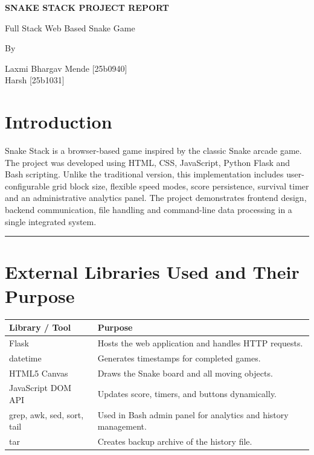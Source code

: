 \documentclass[12pt,a4paper]{article}
\newcommand{\sectionsep}{
    \vspace{1.5em}
    \noindent\rule{\textwidth}{0.8pt}
    \vspace{1.5em}
}
\begin{document}
\begin{titlepage}
    \centering
    \vspace*{2cm}
    {\LARGE\bfseries SNAKE STACK PROJECT REPORT\par}
    \vspace{0.5cm}
    {\large Full Stack Web Based Snake Game\par}
    \vspace{1.5cm}
    {\large By\par}
    \vspace{0.5cm}
    {\large
        Laxmi Bhargav Mende [25b0940]\\[0.3cm]
        Harsh [25b1031]
    \par}
    \vfill
\end{titlepage}

\tableofcontents
\newpage

\section{Introduction}

Snake Stack is a browser-based game inspired by the classic Snake arcade game. The project was developed using HTML, CSS, JavaScript, Python Flask and Bash scripting. Unlike the traditional version, this implementation includes user-configurable grid block size, flexible speed modes, score persistence, survival timer and an administrative analytics panel. The project demonstrates frontend design, backend communication, file handling and command-line data processing in a single integrated system.

\sectionsep

\section{External Libraries Used and Their Purpose}

\begin{center}
\renewcommand{\arraystretch}{1.5}
\begin{tabular}{|p{4.5cm}|p{9cm}|}
\hline
\textbf{Library / Tool} & \textbf{Purpose} \\
\hline
Flask & Hosts the web application and handles HTTP requests. \\
\hline
datetime & Generates timestamps for completed games. \\
\hline
HTML5 Canvas & Draws the Snake board and all moving objects. \\
\hline
JavaScript DOM API & Updates score, timers, and buttons dynamically. \\
\hline
grep, awk, sed, sort, tail & Used in Bash admin panel for analytics and history management. \\
\hline
tar & Creates backup archive of the history file. \\
\hline
\end{tabular}
\end{center}
\end{document}
